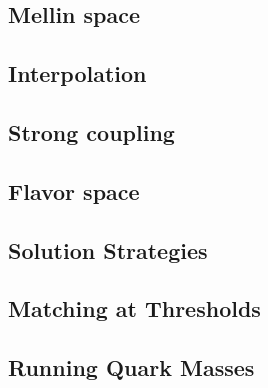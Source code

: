 \subsection{Mellin space}
\label{sec:theory:mellin}


\subsection{Interpolation}
\label{sec:theory:interpolation}


\subsection{Strong coupling}
\label{sec:theory:coupling}


\subsection{Flavor space}
\label{sec:theory:flavor}


\subsection{Solution Strategies}
\label{sec:theory:solutions}


\subsection{Matching at Thresholds}
\label{sec:theory:matching}


\subsection{Running Quark Masses}
\label{sec:theory:msbarmass}

